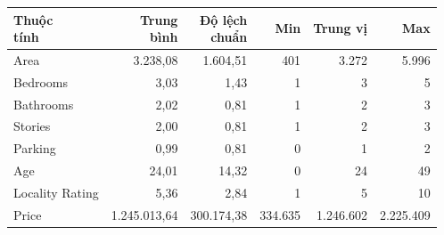 \begin{tabular}{lrrrrr}
\toprule
\makecell[l]{Thuộc\\tính} & \makecell[r]{Trung\\bình} & \makecell[r]{Độ lệch\\chuẩn} & Min & Trung vị & Max \\
\midrule
Area & 3{.}238{,}08 & 1{.}604{,}51 & 401 & 3{.}272 & 5{.}996 \\
Bedrooms & 3{,}03 & 1{,}43 & 1 & 3 & 5 \\
Bathrooms & 2{,}02 & 0{,}81 & 1 & 2 & 3 \\
Stories & 2{,}00 & 0{,}81 & 1 & 2 & 3 \\
Parking & 0{,}99 & 0{,}81 & 0 & 1 & 2 \\
Age & 24{,}01 & 14{,}32 & 0 & 24 & 49 \\
Locality Rating & 5{,}36 & 2{,}84 & 1 & 5 & 10 \\
Price & 1{.}245{.}013{,}64 & 300{.}174{,}38 & 334{.}635 & 1{.}246{.}602 & 2{.}225{.}409 \\
\bottomrule
\end{tabular}

